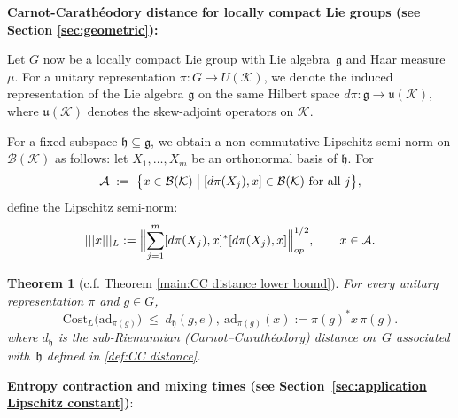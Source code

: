 \documentclass[11pt,reqno]{amsart}
\numberwithin{equation}{section}
\newtheorem{theorem}[lemma]{Theorem}
\newcommand{\mc}{\mathcal}
\newcommand{\adm}{\text{ad}}
\newcommand{\Cost}{\mathrm{Cost}}
\begin{document}
\noindent \textbf{Carnot-Carath\'eodory distance for locally compact Lie groups (see Section \ref{sec:geometric}):}

Let $G$ now be a locally compact Lie group with Lie algebra~$\mathfrak g$ and Haar measure~$\mu$.  For a unitary representation $\pi:G\longrightarrow U(\mathcal K)$, we denote the induced representation of the Lie algebra $\mathfrak{g}$ on the same Hilbert space $d\pi : \mathfrak{g} \to \mathfrak{u}(\mathcal{K})$, where $\mathfrak{u}(\mathcal{K})$ denotes the skew-adjoint operators on $\mathcal{K}$. 

For a fixed subspace $\mathfrak{h} \subseteq\mathfrak g$, we obtain a non-commutative Lipschitz semi-norm on $\mathcal B(\mathcal K)$ as follows: let $X_{1},\dots,X_{m}$ be an orthonormal basis of $\mathfrak{h}$.  For
  \[
    \mc A
    \;:=\;
    \bigl\{x\in\mathcal B(\mathcal K)\bigm|[d\pi(X_{j}),x]\in\mathcal B(\mathcal K)\text{ for all }j\bigr\},
  \]
  define the Lipschitz semi-norm:
  \[
    |||x|||_L
    := 
    \Bigl\|\sum_{j=1}^{m}[d\pi(X_{j}),x]^{*}[d\pi(X_{j}),x]\Bigr\|^{1/2}_{op},
    \qquad x\in \mc A.
  \]


\begin{theorem}[c.f. Theorem \ref{main:CC distance lower bound}]\label{thm:CC distance}
  For every unitary representation $\pi$ and $g\in G$,
  \[
    \Cost_{L}\bigl(\adm_{\pi(g)}\bigr)\;\le\;d_{\mathfrak{h}}(g,e),\ \adm_{\pi(g)}(x):= \pi(g)^* x\,\pi(g).
  \]
  where $d_{\mathfrak{h}}$ is the sub-Riemannian (Carnot–Carath\'eodory) distance on~$G$ associated with~$\mathfrak{h}$ defined in \eqref{def:CC distance}.
\end{theorem}

\medskip
\noindent \textbf{Entropy contraction and mixing times (see Section~\ref{sec:application Lipschitz constant})}: 
\end{document}
